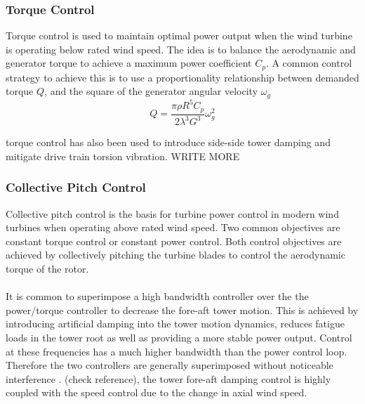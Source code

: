 \subsubsection{Torque Control}
Torque control is used to maintain optimal power output when the wind turbine is operating below rated wind speed. The idea is to balance the aerodynamic and generator torque to achieve a maximum power coefficient $C_p$. A common control strategy to achieve this is to use a proportionality relationship between demanded torque $Q$, and the square of the generator angular velocity $\omega_g$
$$Q = \frac{\pi \rho R^5 C_p}{2\lambda^3 G^3}\omega_g^2$$ \cite{15_bossanyi}

torque control has also been used to introduce side-side tower damping and mitigate drive train torsion vibration. WRITE MORE
\subsubsection{Collective Pitch Control}
Collective pitch control is the basis for turbine power control in modern wind turbines when operating above rated wind speed. Two common objectives are constant torque control or constant power control. Both control objectives are achieved by collectively pitching the turbine blades to control the aerodynamic torque of the rotor. 
\\~\\
It is common to superimpose a high bandwidth controller over the the power/torque controller to decrease the fore-aft tower motion. This is achieved by introducing artificial damping into the tower motion dynamics, reduces fatigue loads in the tower root as well as providing a more stable power output. Control at these frequencies has a much higher bandwidth than the power control loop. Therefore the two controllers are generally superimposed without noticeable interference \cite{15_bossanyi}. \citet{17_Geyler} (check reference), the tower fore-aft damping control is highly coupled with the speed control due to the change in axial wind speed. 

